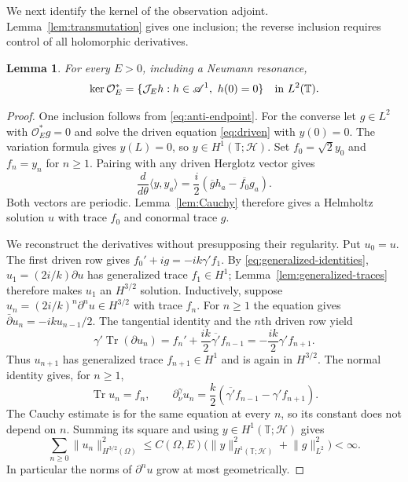 \documentclass[11pt]{amsart}
\numberwithin{equation}{section}
\newtheorem{lemma}{Lemma}[section]
\newcommand{\HH}{\mathscr H}
\newcommand{\T}{\mathbb T}
\newcommand{\OO}{\mathcal O}
\newcommand{\JJ}{\mathcal J}
\newcommand{\ip}[2]{\langle #1,#2\rangle}
\newcommand{\norm}[1]{\lVert #1\rVert}
\begin{document}
We next identify the kernel of the observation adjoint.
Lemma~\ref{lem:transmutation} gives one inclusion; the reverse
inclusion requires control of all holomorphic derivatives.

\begin{lemma}\label{lem:exact-kernel}
For every $E>0$, including a Neumann resonance,
\begin{equation}\label{eq:exact-kernel}
 \ker\OO_E^*=
 \{\JJ_Eh:h\in\mathscr A^1,\ h(0)=0\}\quad\hbox{in }L^2(\T).
\end{equation}
\end{lemma}
\begin{proof}
One inclusion follows from \eqref{eq:anti-endpoint}. For the converse
let $g\in L^2$ with $\OO_E^*g=0$ and solve the driven equation
\eqref{eq:driven} with $y(0)=0$. The variation formula gives
$y(L)=0$, so $y\in H^1(\T;\HH)$. Set $f_0=\sqrt2 y_0$ and $f_n=y_n$
for $n\ge1$. Pairing with any driven Herglotz vector gives
\[
 \frac d{d\theta}\ip y{y_a}=\frac i2
       (\overline g h_a-\overline{f_0}g_a).
\]
Both vectors are periodic. Lemma~\ref{lem:Cauchy} therefore gives a
Helmholtz solution $u$ with trace $f_0$ and conormal trace $g$.

We reconstruct the derivatives without presupposing their regularity.
Put $u_0=u$. The first driven row gives
$f_0'+ig=-ik\gamma'f_1$. By \eqref{eq:generalized-identities},
$u_1=(2i/k)\partial u$ has generalized trace $f_1\in H^1$;
Lemma~\ref{lem:generalized-traces} therefore makes $u_1$ an
$H^{3/2}$ solution. Inductively, suppose
$u_n=(2i/k)^n\partial^n u\in H^{3/2}$ with trace $f_n$.
For $n\ge1$ the equation gives
$\bar\partial u_n=-ik u_{n-1}/2$. The tangential identity and the
$n$th driven row yield
\[
 \gamma'\operatorname{Tr}(\partial u_n)
   =f_n'+\frac{ik}{2}\overline{\gamma'}f_{n-1}
   =-\frac{ik}{2}\gamma'f_{n+1}.
\]
Thus $u_{n+1}$ has generalized trace $f_{n+1}\in H^1$ and is again
in $H^{3/2}$. The normal identity gives, for $n\ge1$,
\[
 \operatorname{Tr}u_n=f_n,\qquad
 \partial_\nu^\gamma u_n=\frac k2
        (\overline{\gamma'}f_{n-1}-\gamma'f_{n+1}).
\]
The Cauchy estimate is for the same equation at every $n$, so its
constant does not depend on $n$. Summing its square and using
$y\in H^1(\T;\HH)$ gives
\begin{equation}\label{eq:derivative-bound}
 \sum_{n\ge0}\norm{u_n}_{H^{3/2}(\Omega)}^2
 \le C(\Omega,E)\bigl(\norm y_{H^1(\T;\HH)}^2+\norm g_{L^2}^2\bigr)<\infty.
\end{equation}
In particular the norms of $\partial^n u$ grow at most geometrically.


\end{proof}
\end{document}
